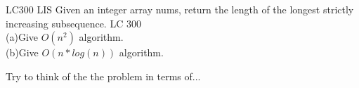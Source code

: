 \begin{problem}{LC300 LIS}
    Given an integer array nums, return the length of the longest strictly increasing subsequence. LC 300\\
    (a)Give $O(n^2)$ algorithm.\\
    (b)Give $O(n*log(n))$ algorithm.

\end{problem}


\begin{hints}
    Try to think of the the problem in terms of...
\end{hints}


%   

\immediate{}












            
                  
